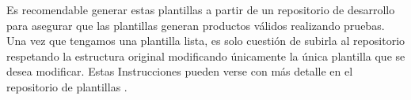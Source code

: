 \documentclass[12pt, a4paper, twoside]{article}
\begin{document}
\begin{umaappendices}
	Es recomendable generar estas plantillas a partir de un repositorio de desarrollo \cite{dockerfile_template_dev} para asegurar que las plantillas generan productos válidos realizando pruebas.
	Una vez que tengamos una plantilla lista, es solo cuestión de subirla al repositorio respetando la estructura original modificando únicamente la única plantilla que se desea modificar.
	Estas Instrucciones pueden verse con más detalle en el repositorio de plantillas \cite{m4rdom_templates}.




\end{umaappendices}


\end{document}
